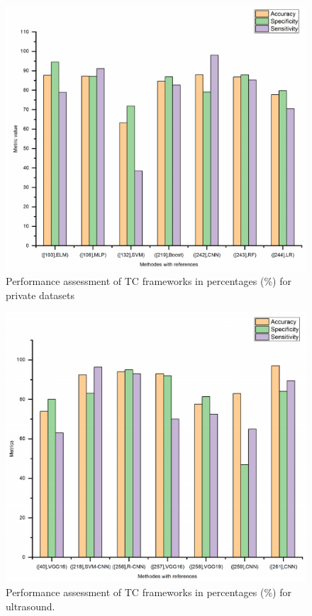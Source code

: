 \documentclass[a4paper,fleqn]{cas-sc}
\begin{document}
\begin{figure}[t!]
\centering
\includegraphics[scale=0.7]{fig15}
\caption{Performance assessment of TC frameworks in percentages (\%) for private datasets }
\label{fig15}
\end{figure}

\begin{figure}[t!]
\centering
\includegraphics[scale=0.7]{fig16}
\caption{Performance assessment of TC frameworks in percentages (\%) for ultrasound.}
\label{fig16}
\end{figure}
\end{document}
